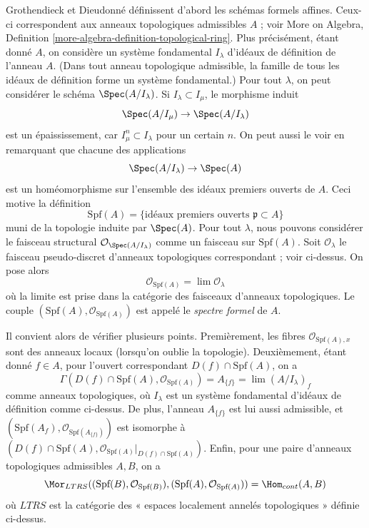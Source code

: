\medskip\noindent
Grothendieck et Dieudonné définissent d'abord les schémas formels affines.
Ceux-ci correspondent aux anneaux topologiques admissibles $A$ ; voir
More on Algebra, Definition \ref{more-algebra-definition-topological-ring}.
Plus précisément, étant donné $A$, on considère un système fondamental $I_\lambda$ d'idéaux
de définition de l'anneau $A$. (Dans tout anneau topologique admissible,
la famille de tous les idéaux de définition forme un système fondamental.)
Pour tout $\lambda$, on peut considérer le
schéma $\Spec(A/I_\lambda)$. Si $I_\lambda \subset I_\mu$, le
morphisme induit
$$
\Spec(A/I_\mu) \to \Spec(A/I_\lambda)
$$
est un épaississement, car $I_\mu^n \subset I_\lambda$ pour un certain $n$.
On peut aussi le voir en remarquant que chacune des
applications
$$
\Spec(A/I_\lambda) \to \Spec(A)
$$
est un homéomorphisme sur l'ensemble des idéaux premiers ouverts de $A$.
Ceci motive la définition
$$
\text{Spf}(A) = \{\text{idéaux premiers ouverts }\mathfrak p \subset A\}
$$
muni de la topologie induite par $\Spec(A)$. Pour tout $\lambda$,
nous pouvons considérer le faisceau structural $\mathcal{O}_{\Spec(A/I_\lambda)}$
comme un faisceau sur $\text{Spf}(A)$. Soit $\mathcal{O}_\lambda$ le
faisceau pseudo-discret d'anneaux topologiques correspondant ; voir ci-dessus.
On pose alors
$$
\mathcal{O}_{\text{Spf}(A)} = \lim \mathcal{O}_\lambda
$$
où la limite est prise dans la catégorie des faisceaux d'anneaux topologiques.
Le couple $(\text{Spf}(A), \mathcal{O}_{\text{Spf}(A)})$ est appelé le
{\it spectre formel} de $A$.

\medskip\noindent
Il convient alors de vérifier plusieurs points. Premièrement,
les fibres $\mathcal{O}_{\text{Spf}(A), x}$ sont des anneaux locaux
(lorsqu'on oublie la topologie). Deuxièmement, étant donné
$f \in A$, pour l'ouvert correspondant $D(f) \cap \text{Spf}(A)$,
on a
$$
\Gamma(D(f) \cap \text{Spf}(A), \mathcal{O}_{\text{Spf}(A)})
= A_{\{f\}} = \lim (A/I_\lambda)_f
$$
comme anneaux topologiques, où $I_\lambda$ est un système fondamental d'idéaux
de définition comme ci-dessus. De plus, l'anneau $A_{\{f\}}$ est lui aussi admissible, et
$(\text{Spf}(A_f), \mathcal{O}_{\text{Spf}(A_{\{f\}})})$
est isomorphe à
$(D(f) \cap \text{Spf}(A),
\mathcal{O}_{\text{Spf}(A)}|_{D(f) \cap \text{Spf}(A)})$.
Enfin, pour une paire d'anneaux topologiques admissibles $A, B$,
on a
\begin{equation}
\label{equation-morphisms-affine-formal-schemes}
\Mor_{LTRS}((\text{Spf}(B), \mathcal{O}_{\text{Spf}(B)}),
(\text{Spf}(A), \mathcal{O}_{\text{Spf}(A)}))
= \Hom_{cont}(A, B)
\end{equation}
où $LTRS$ est la catégorie des « espaces localement annelés topologiques »
définie ci-dessus.

